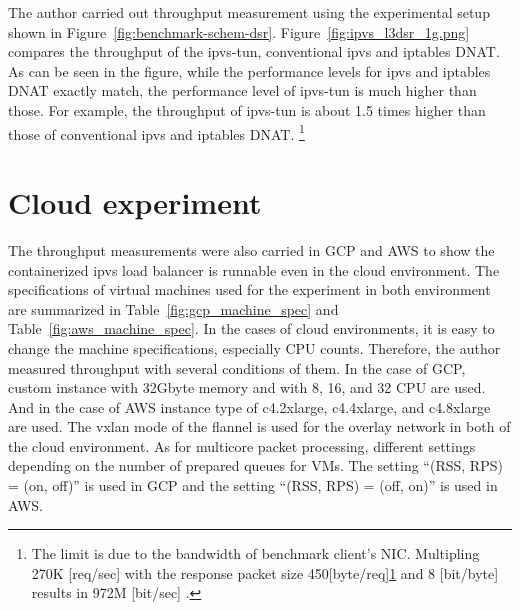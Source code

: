 The author carried out throughput measurement using the experimental setup shown in Figure~\ref{fig:benchmark-schem-dsr}.
Figure~\ref{fig:ipvs_l3dsr_1g.png} compares the throughput of the ipvs-tun, conventional ipvs and iptables DNAT.
As can be seen in the figure, while the performance levels for ipvs and iptables DNAT exactly match, the performance level of ipvs-tun is much higher than those.
For example, the throughput of ipvs-tun is about 1.5 times higher than those of conventional ipvs and iptables DNAT.
\footnote{The limit is due to the bandwidth of benchmark client's NIC.
Multipling 270K [req/sec] with the response packet size 450[byte/req]\ref{} and 8 [bit/byte] results in 972M [bit/sec] . }



\FloatBarrier

\section{Cloud experiment}

The throughput measurements were also carried in GCP and AWS to show the containerized ipvs load balancer is runnable even in the cloud environment.
The specifications of virtual machines used for the experiment in both environment are summarized in Table~\ref{fig:gcp_machine_spec} and Table~\ref{fig:aws_machine_spec}.
In the cases of cloud environments, it is easy to change the machine specifications, especially CPU counts.
Therefore, the author measured throughput with several conditions of them.
In the case of GCP, custom instance with 32Gbyte memory and with 8, 16, and 32 CPU are used.
And in the case of AWS instance type of c4.2xlarge, c4.4xlarge, and c4.8xlarge are used.
The vxlan mode of the flannel is used for the overlay network in both of the cloud environment.
As for multicore packet processing, different settings depending on the number of prepared queues for VMs. 
The setting \enquote{(RSS, RPS) = (on, off)} is used in GCP and the setting \enquote{(RSS, RPS) = (off, on)} is used in AWS.

